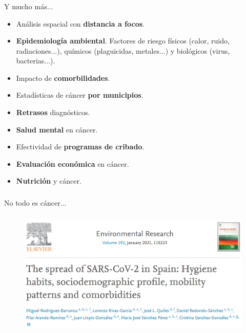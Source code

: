 \documentclass{beamer}
\begin{document}

\begin{frame}\frametitle{}
	\begin{block}{Y mucho más...}
		\begin{itemize}
			\item Análisis espacial con \textbf{distancia a focos}.
			\item \textbf{Epidemiología ambiental}. Factores de riesgo físicos (calor, ruido, radiaciones...), químicos (plaguicidas, metales...) y biológicos (virus, bacterias...).
			\item Impacto de \textbf{comorbilidades}.
			\item Estadísticas de cáncer \textbf{por municipios}.
			\item \textbf{Retrasos} diagnósticos.
			\item \textbf{Salud mental} en cáncer.
			\item Efectividad de \textbf{programas de cribado}.
			\item \textbf{Evaluación económica} en cáncer.
			\item \textbf{Nutrición} y cáncer.
		\end{itemize}
	\end{block}
\end{frame}


\begin{frame}\frametitle{}
	\centering
	\huge {No todo es cáncer...}
\end{frame}


\begin{frame}\frametitle{}
	\begin{figure}
		\centering
		\includegraphics[width=.9\textwidth]{images/covid1.png}
	\end{figure}
\end{frame}
\end{document}
